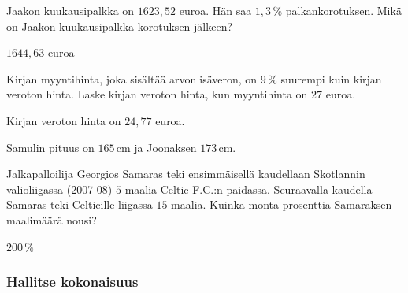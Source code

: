 \begin{tehtavasivu}
\begin{tehtava}
    Jaakon kuukausipalkka on $1623,52$ euroa. Hän saa $1,3\,\%$ palkankorotuksen.
    Mikä on Jaakon kuukausipalkka korotuksen jälkeen?
    \begin{vastaus}
        $1644,63$ euroa
    \end{vastaus}
\end{tehtava}

\begin{tehtava}
    Kirjan myyntihinta, joka sisältää arvonlisäveron, on $9\,\%$ suurempi kuin kirjan veroton hinta.
    Laske kirjan veroton hinta, kun myyntihinta on $27$ euroa.
    \begin{vastaus}
        Kirjan veroton hinta on $24,77$ euroa.
    \end{vastaus}
\end{tehtava}

\begin{tehtava}
    Samulin pituus on $165$\,cm ja Joonaksen $173$\,cm.
    \begin{alakohdat}
    \end{alakohdat}
    \begin{vastaus}
        \begin{alakohdat}
        \end{alakohdat}
    \end{vastaus}
\end{tehtava}

\begin{tehtava}
    Jalkapalloilija Georgios Samaras teki ensimmäisellä kaudellaan Skotlannin valioliigassa (2007-08)
    $5$ maalia Celtic F.C.:n paidassa. Seuraavalla kaudella Samaras teki Celticille liigassa $15$ maalia.
    Kuinka monta prosenttia Samaraksen maalimäärä nousi?
    \begin{vastaus}
        $200\,\%$
    \end{vastaus}
\end{tehtava}

\subsubsection*{Hallitse kokonaisuus}


\end{tehtavasivu}
